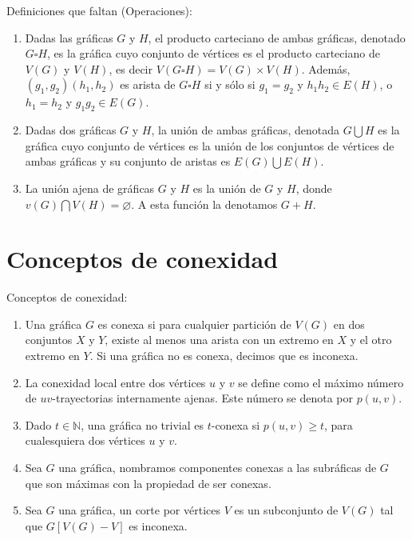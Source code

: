     \begin{definicion} Definiciones que faltan (Operaciones):
    \begin{enumerate}
        \item Dadas las gr\'aficas $G$ y $H$, el producto carteciano de ambas
        gr\'aficas, denotado $G \square H$, es la gr\'afica cuyo conjunto de
        v\'ertices es el producto carteciano de $V(G)$ y $V(H)$, es decir $V(G
        \square H) = V(G) \times V(H)$. Adem\'as, $(g_1,g_2)(h_1,h_2)$ es arista
        de $G \square H$ si y s\'olo si $g_1 = g_2$ y $h_1h_2 \in E(H)$, o $h_1
        = h_2$ y $g_1g_2 \in E(G)$.
        \item Dadas dos gr\'aficas $G$ y $H$, la uni\'on de ambas gr\'aficas,
        denotada $G \bigcup H$ es la gr\'afica cuyo conjunto de v\'ertices es la
        uni\'on de los conjuntos de v\'ertices de ambas gr\'aficas y su conjunto
        de aristas es $E(G) \bigcup E(H)$. 
        \item La uni\'on ajena de gr\'aficas $G$ y $H$ es la uni\'on de $G$ y
        $H$, donde $v(G) \bigcap V(H) = \varnothing$. A esta funci\'on la
        denotamos $G + H$. 
    \end{enumerate}
\end{definicion}

\section{Conceptos de conexidad}
\label{sec:conexidad}

\begin{definicion} Conceptos de conexidad:
    \label{def:conexidad}
    \begin{enumerate}    
        \item Una gr\'afica $G$ es conexa si para cualquier partici\'on de
        $V(G)$ en dos conjuntos $X$ y $Y$, existe al menos una arista con un
        extremo en $X$ y el otro extremo en $Y$. Si una gr\'afica no es conexa,
        decimos que es inconexa.
        \item La conexidad local entre dos v\'ertices $u$ y $v$ se define como
        el m\'aximo n\'umero de $uv$-trayectorias internamente ajenas. Este
        n\'umero se denota por $p(u,v)$.
        \item Dado $t \in \mathbb{N}$, una gr\'afica no trivial es $t$-conexa si
        $p(u,v) \geq t$, para cualesquiera dos v\'ertices $u$ y $v$. 
        \item Sea $G$ una gr\'afica, nombramos componentes conexas a las
        subr\'aficas de $G$ que son m\'aximas con la propiedad de ser conexas.
        \item Sea $G$ una gr\'afica, un corte por v\'ertices $V$ es un
        subconjunto de $V(G)$ tal que $G[V(G)-V]$ es inconexa.
    \end{enumerate}
\end{definicion}

